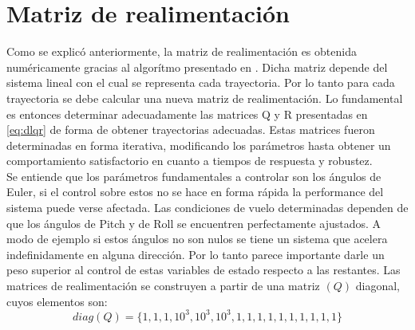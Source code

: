 \documentclass[main]{subfiles}
\begin{document}
\section{Matriz de realimentaci\'on}

Como se explic\'o anteriormente, la matriz de realimentaci\'on es obtenida num\'ericamente gracias al algor\'itmo presentado en \cite{bib:lqr-discreto}. Dicha matriz depende del sistema lineal con el cual se representa cada trayectoria. Por lo tanto para cada trayectoria se debe calcular una nueva matriz de realimentaci\'on. Lo fundamental es entonces determinar adecuadamente las matrices Q y R presentadas en \ref{eq:dlqr} de forma de obtener trayectorias adecuadas. Estas matrices fueron determinadas en forma iterativa, modificando los par\'ametros hasta obtener un comportamiento satisfactorio en cuanto a tiempos de respuesta y robustez.\\

Se entiende que los par\'ametros fundamentales a controlar son los \'angulos de Euler, si el control sobre estos no se hace en forma r\'apida la performance del sistema puede verse afectada.  Las condiciones de vuelo determinadas dependen de que los \'angulos de Pitch y de Roll se encuentren perfectamente ajustados. A modo de ejemplo si estos \'angulos no son nulos se tiene un sistema que acelera indefinidamente en alguna direcci\'on. Por lo tanto parece importante darle un peso superior al control de estas variables de estado respecto a las restantes. Las matrices de realimentaci\'on se construyen a partir de una matriz $(Q)$ diagonal, cuyos elementos son:
\begin{equation}
\label{eq:Q}
diag(Q) = \{1, 1, 1, 10^{3},10^{3},10^{3},1,1,1,1,1,1,1,1,1,1 \}
\end{equation}
\end{document}
